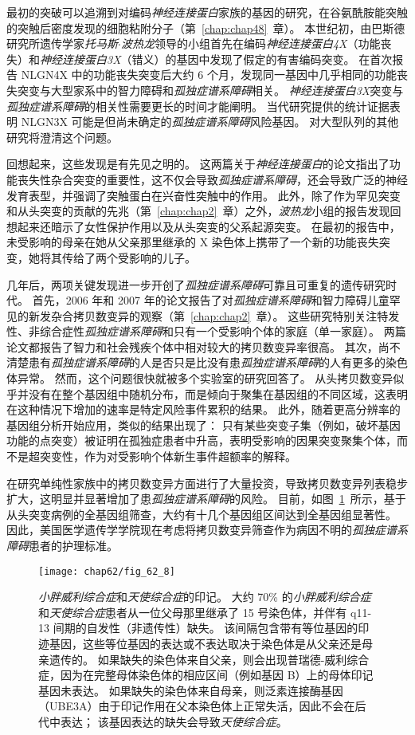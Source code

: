 最初的突破可以追溯到对编码\textit{神经连接蛋白}家族的基因的研究，在谷氨酰胺能突触的突触后密度发现的细胞粘附分子（第~\ref{chap:chap48}~章）。
本世纪初，由巴斯德研究所遗传学家\textit{托马斯$\cdot$波热龙}领导的小组首先在编码\textit{神经连接蛋白4X}（功能丧失）和\textit{神经连接蛋白3X}（错义）的基因中发现了假定的有害编码突变。
在首次报告 NLGN4X 中的功能丧失突变后大约 6 个月，发现同一基因中几乎相同的功能丧失突变与大型家系中的智力障碍和\textit{孤独症谱系障碍}相关。
\textit{神经连接蛋白3X}突变与\textit{孤独症谱系障碍}的相关性需要更长的时间才能阐明。
当代研究提供的统计证据表明 NLGN3X 可能是但尚未确定的\textit{孤独症谱系障碍}风险基因。
对大型队列的其他研究将澄清这个问题。


回想起来，这些发现是有先见之明的。
这两篇关于\textit{神经连接蛋白}的论文指出了功能丧失性杂合突变的重要性，这不仅会导致\textit{孤独症谱系障碍}，还会导致广泛的神经发育表型，并强调了突触蛋白在兴奋性突触中的作用。
此外，除了作为罕见突变和从头突变的贡献的先兆（第~\ref{chap:chap2}~章）之外，\textit{波热龙}小组的报告发现回想起来还暗示了女性保护作用以及从头突变的父系起源突变。
在最初的报告中，未受影响的母亲在她从父亲那里继承的 X 染色体上携带了一个新的功能丧失突变，她将其传给了两个受影响的儿子。


几年后，两项关键发现进一步开创了\textit{孤独症谱系障碍}可靠且可重复的遗传研究时代。
首先，2006 年和 2007 年的论文报告了对\textit{孤独症谱系障碍}和智力障碍儿童罕见的新发杂合拷贝数变异的观察（第~\ref{chap:chap2}~章）。
这些研究特别关注特发性、非综合症性\textit{孤独症谱系障碍}和只有一个受影响个体的家庭（单一家庭）。
两篇论文都报告了智力和社会残疾个体中相对较大的拷贝数变异率很高。
其次，尚不清楚患有\textit{孤独症谱系障碍}的人是否只是比没有患\textit{孤独症谱系障碍}的人有更多的染色体异常。
然而，这个问题很快就被多个实验室的研究回答了。
从头拷贝数变异似乎并没有在整个基因组中随机分布，而是倾向于聚集在基因组的不同区域，这表明在这种情况下增加的速率是特定风险事件累积的结果。
此外，随着更高分辨率的基因组分析开始应用，类似的结果出现了：
只有某些突变子集（例如，破坏基因功能的点突变）被证明在孤独症患者中升高，表明受影响的因果突变聚集个体，而不是超突变性，作为对受影响个体新生事件超额率的解释。


在研究单纯性家族中的拷贝数变异方面进行了大量投资，导致拷贝数变异列表稳步扩大，这明显并显著增加了患\textit{孤独症谱系障碍}的风险。
目前，如图~\ref{fig:62_8}~所示，基于从头突变病例的全基因组筛查，大约有十几个基因组区间达到全基因组显著性。
因此，美国医学遗传学学院现在考虑将拷贝数变异筛查作为病因不明的\textit{孤独症谱系障碍}患者的护理标准。


\begin{figure}[htbp]
	\centering
	\texttt{[image: chap62/fig\_62\_8]}
	\caption{\textit{小胖威利综合症}和\textit{天使综合症}的印记。
		大约 70\% 的\textit{小胖威利综合症}和\textit{天使综合症}患者从一位父母那里继承了 15 号染色体，并伴有 q11-13 间期的自发性（非遗传性）缺失。
		该间隔包含带有等位基因的印迹基因，这些等位基因的表达或不表达取决于染色体是从父亲还是母亲遗传的。
		如果缺失的染色体来自父亲，则会出现普瑞德-威利综合症，因为在完整母体染色体的相应区间（例如基因 B）上的母体印记基因未表达。
		如果缺失的染色体来自母亲，则泛素连接酶基因（UBE3A）由于印记作用在父本染色体上正常失活，因此不会在后代中表达；
		该基因表达的缺失会导致\textit{天使综合症}。}
	\label{fig:62_8}
\end{figure}


